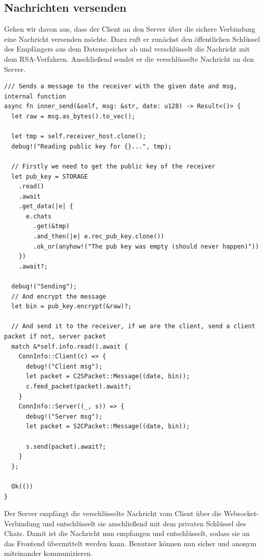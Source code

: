 \documentclass[a4paper,ngerman, headheight=28pt,12pt, footheight=27pt]{scrartcl}
\begin{document}
\subsection{Nachrichten versenden}
Gehen wir davon aus, dass der Client an den Server über die sichere Verbindung eine Nachricht versenden möchte. Dazu ruft er zunächst den öffentlichen Schlüssel des Empfängers aus dem Datenspeicher ab und verschlüsselt die Nachricht mit dem RSA-Verfahren. Anschließend sendet er die verschlüsselte Nachricht an den Server.
\begin{verbatim}
/// Sends a message to the receiver with the given date and msg, internal function
async fn inner_send(&self, msg: &str, date: u128) -> Result<()> {
  let raw = msg.as_bytes().to_vec();

  let tmp = self.receiver_host.clone();
  debug!("Reading public key for {}...", tmp);

  // Firstly we need to get the public key of the receiver
  let pub_key = STORAGE
    .read()
    .await
    .get_data(|e| {
      e.chats
        .get(&tmp)
        .and_then(|e| e.rec_pub_key.clone())
        .ok_or(anyhow!("The pub key was empty (should never happen)"))
    })
    .await?;

  debug!("Sending");
  // And encrypt the message
  let bin = pub_key.encrypt(&raw)?;

  // And send it to the receiver, if we are the client, send a client packet if not, server packet
  match &*self.info.read().await {
    ConnInfo::Client(c) => {
      debug!("Client msg");
      let packet = C2SPacket::Message((date, bin));
      c.feed_packet(packet).await?;
    }
    ConnInfo::Server((_, s)) => {
      debug!("Server msg");
      let packet = S2CPacket::Message((date, bin));

      s.send(packet).await?;
    }
  };

  Ok(())
}
\end{verbatim}
Der Server empfängt die verschlüsselte Nachricht vom Client über die Websocket-Verbindung und entschlüsselt sie anschließend mit dem privaten Schlüssel des Chats. Damit ist die Nachricht nun empfangen und entschlüsselt, sodass sie an das Frontend übermittelt werden kann. Benutzer können nun sicher und anonym miteinander kommunizieren.
\end{document}
